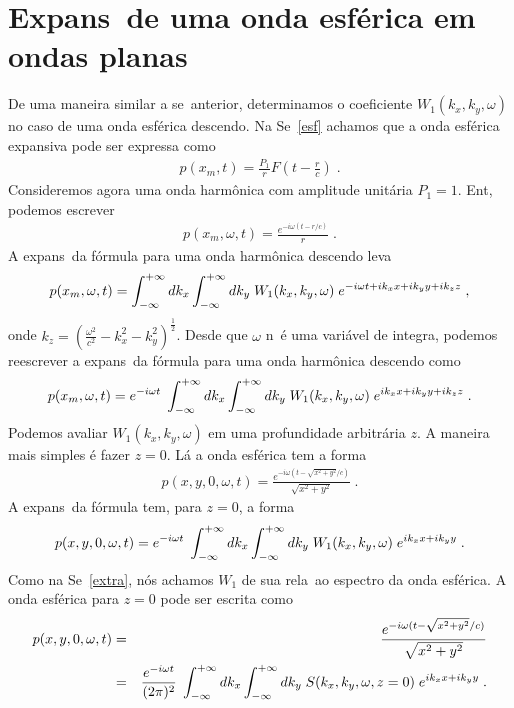 \section{Expans\ao\ de uma onda esf\'erica em ondas planas}

De uma maneira similar a se\cao\ anterior, determinamos o
coeficiente $W_1(k_x,k_y,\omega)$ no caso de uma onda
esf\'erica descendo. Na Se\cao~\ref{esf}  achamos que a onda
esf\'erica expansiva pode ser expressa como
\begin{eqnarray}
p(x_m,t) = \frac{P_1}{r} F\left(t-\frac{r}{c}\right) \; .
\end{eqnarray}
Consideremos agora uma onda harm\^onica com amplitude
unit\'aria $P_1 = 1$.  Ent\ao, podemos escrever
\begin{eqnarray}
p(x_m,\omega,t) = \frac{e^{-i\omega(t - r/c)}}{r} \; .
\end{eqnarray}
A expans\ao\ da f\'ormula para uma onda harm\^onica descendo
leva
\begin{eqnarray}
p(x_m,\omega,t) = \int_{-\infty}^{+\infty} dk_x \int_{-\infty}^{+\infty} dk_y \; W_1(k_x,k_y,\omega) \;
e^{-i\omega t + ik_x x + ik_y y + ik_z z}  \; ,
\end{eqnarray}
onde $k_z = (\frac{\omega^2}{c^2} - k_x^2 - k_y^2)^{\frac{1}{2}}$.
Desde que $\omega$ n\ao\ \'e uma vari\'avel de integra\cao, podemos
reescrever a expans\ao\ da f\'ormula para uma onda harm\^onica
descendo como
\begin{eqnarray}
p(x_m,\omega,t) = e^{-i\omega t} \; \int_{-\infty}^{+\infty} dk_x \int_{-\infty}^{+\infty} dk_y \;
W_1(k_x,k_y,\omega) \; e^{ik_x x + ik_y y + ik_z z}  \; .
\end{eqnarray}
Podemos avaliar $W_1(k_x,k_y,\omega)$ em uma profundidade arbitr\'aria
$z$. A maneira mais simples \'e fazer $z=0$.  L\'a a onda esf\'erica tem a
forma
\begin{eqnarray}
p(x,y,0,\omega,t) = \frac{e^{-i\omega(t-\sqrt{x^2+y^2}/c)}}
{\sqrt{x^2+y^2}} \; .
\end{eqnarray}
A expans\ao\ da f\'ormula tem, para $z=0$, a forma
\begin{eqnarray}
p(x,y,0,\omega,t) = e^{-i\omega t} \; \int_{-\infty}^{+\infty} dk_x \int_{-\infty}^{+\infty} dk_y \;
W_1(k_x,k_y,\omega) \; e^{ik_x x + ik_y y}  \; .
\end{eqnarray}
Como na Se\cao~\ref{extra}, n\'os achamos $W_1$ de sua rela\cao\
ao espectro da onda esf\'erica. A onda esf\'erica para $z=0$
pode ser escrita como
\begin{eqnarray}
p(x,y,0,\omega,t) & = & \frac{e^{-i\omega(t-\sqrt{x^2+y^2}/c)}}{\sqrt{x^2+y^2}}
\nonumber \\
& = & \frac{e^{-i\omega t}}{(2\pi)^2} \; \int_{-\infty}^{+\infty} dk_x \int_{-\infty}^{+\infty} dk_y \;
S(k_x,k_y,\omega,z=0) \; e^{ik_x x + ik_y y}  \; .
\end{eqnarray}
